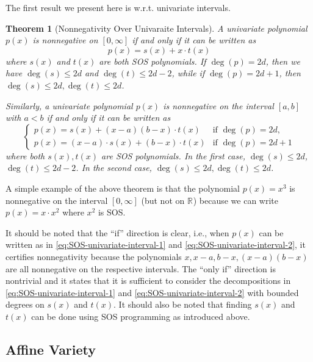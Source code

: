 \documentclass[
]{book}
\newtheorem{theorem}{Theorem}[chapter]
\theoremstyle{definition}
\theoremstyle{definition}
\theoremstyle{definition}
\theoremstyle{definition}
\theoremstyle{remark}
\begin{document}
The first result we present here is w.r.t. univariate intervals.

\begin{theorem}[Nonnegativity Over Univaraite Intervals]
\protect\hypertarget{thm:SOSUnivariateInterval}{}\label{thm:SOSUnivariateInterval}A univariate polynomial \(p(x)\) is nonnegative on \([0,\infty]\) if and only if it can be written as
\begin{equation}
p(x) = s(x) + x \cdot t(x)
\label{eq:SOS-univariate-interval-1}
\end{equation}
where \(s(x)\) and \(t(x)\) are both SOS polynomials. If \(\deg(p) = 2d\), then we have \(\deg(s) \leq 2d\) and \(\deg(t) \leq 2d -2\), while if \(\deg(p) = 2d+1\), then \(\deg(s) \leq 2d, \deg(t) \leq 2d\).

Similarly, a univariate polynomial \(p(x)\) is nonnegative on the interval \([a,b]\) with \(a < b\) if and only if it can be written as
\begin{equation}
\begin{cases}
p(x) = s(x) + (x-a)(b-x) \cdot t(x) & \text{if } \deg(p) = 2d, \\
p(x) = (x-a)\cdot s(x) + (b-x) \cdot t(x) & \text{if } \deg(p) = 2d + 1
\end{cases}
\label{eq:SOS-univariate-interval-2}
\end{equation}
where both \(s(x),t(x)\) are SOS polynomials. In the first case, \(\deg(s) \leq 2d\), \(\deg(t) \leq 2d -2\). In the second case, \(\deg(s) \leq 2d, \deg(t) \leq 2d\).
\end{theorem}

A simple example of the above theorem is that the polynomial \(p(x)=x^3\) is nonnegative on the interval \([0,\infty]\) (but not on \(\mathbb{R}^{}\)) because we can write \(p(x) = x \cdot x^2\) where \(x^2\) is SOS.

It should be noted that the ``if'' direction is clear, i.e., when \(p(x)\) can be written as in \eqref{eq:SOS-univariate-interval-1} and \eqref{eq:SOS-univariate-interval-2}, it certifies nonnegativity because the polynomials \(x, x-a, b-x, (x-a)(b-x)\) are all nonnegative on the respective intervals. The ``only if'' direction is nontrivial and it states that it is sufficient to consider the decompositions in \eqref{eq:SOS-univariate-interval-1} and \eqref{eq:SOS-univariate-interval-2} with bounded degrees on \(s(x)\) and \(t(x)\). It should also be noted that finding \(s(x)\) and \(t(x)\) can be done using SOS programming as introduced above.

\subsection{Affine Variety}\label{affine-variety}
\end{document}
